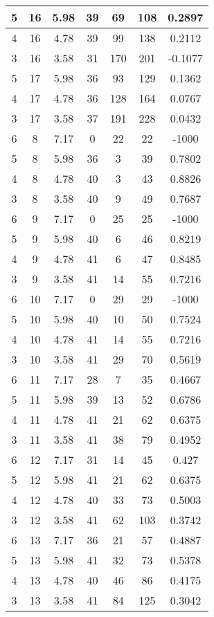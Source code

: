 \documentclass[letterpaper, 12pt]{article}
\begin{document}
\begin{longtable}{|c|c|c|c|c|c|c|}
\hline
5 & 16 & 5.98 & 39 & 69 & 108 & 0.2897 \\
\hline
4 & 16 & 4.78 & 39 & 99 & 138 & 0.2112 \\
\hline
3 & 16 & 3.58 & 31 & 170 & 201 & -0.1077 \\
\hline
5 & 17 & 5.98 & 36 & 93 & 129 & 0.1362 \\
\hline
4 & 17 & 4.78 & 36 & 128 & 164 & 0.0767 \\
\hline
3 & 17 & 3.58 & 37 & 191 & 228 & 0.0432 \\
\hline
6 & 8 & 7.17 & 0 & 22 & 22 & -1000 \\
\hline
5 & 8 & 5.98 & 36 & 3 & 39 & 0.7802 \\
\hline
4 & 8 & 4.78 & 40 & 3 & 43 & 0.8826 \\
\hline
3 & 8 & 3.58 & 40 & 9 & 49 & 0.7687 \\
\hline
6 & 9 & 7.17 & 0 & 25 & 25 & -1000 \\
\hline
5 & 9 & 5.98 & 40 & 6 & 46 & 0.8219 \\
\hline
4 & 9 & 4.78 & 41 & 6 & 47 & 0.8485 \\
\hline
3 & 9 & 3.58 & 41 & 14 & 55 & 0.7216 \\
\hline
6 & 10 & 7.17 & 0 & 29 & 29 & -1000 \\
\hline
5 & 10 & 5.98 & 40 & 10 & 50 & 0.7524 \\
\hline
4 & 10 & 4.78 & 41 & 14 & 55 & 0.7216 \\
\hline
3 & 10 & 3.58 & 41 & 29 & 70 & 0.5619 \\
\hline
6 & 11 & 7.17 & 28 & 7 & 35 & 0.4667 \\
\hline
5 & 11 & 5.98 & 39 & 13 & 52 & 0.6786 \\
\hline
4 & 11 & 4.78 & 41 & 21 & 62 & 0.6375 \\
\hline
3 & 11 & 3.58 & 41 & 38 & 79 & 0.4952 \\
\hline
6 & 12 & 7.17 & 31 & 14 & 45 & 0.427 \\
\hline
5 & 12 & 5.98 & 41 & 21 & 62 & 0.6375 \\
\hline
4 & 12 & 4.78 & 40 & 33 & 73 & 0.5003 \\
\hline
3 & 12 & 3.58 & 41 & 62 & 103 & 0.3742 \\
\hline
6 & 13 & 7.17 & 36 & 21 & 57 & 0.4887 \\
\hline
5 & 13 & 5.98 & 41 & 32 & 73 & 0.5378 \\
\hline
4 & 13 & 4.78 & 40 & 46 & 86 & 0.4175 \\
\hline
3 & 13 & 3.58 & 41 & 84 & 125 & 0.3042 \\

\end{longtable}
\end{document}
